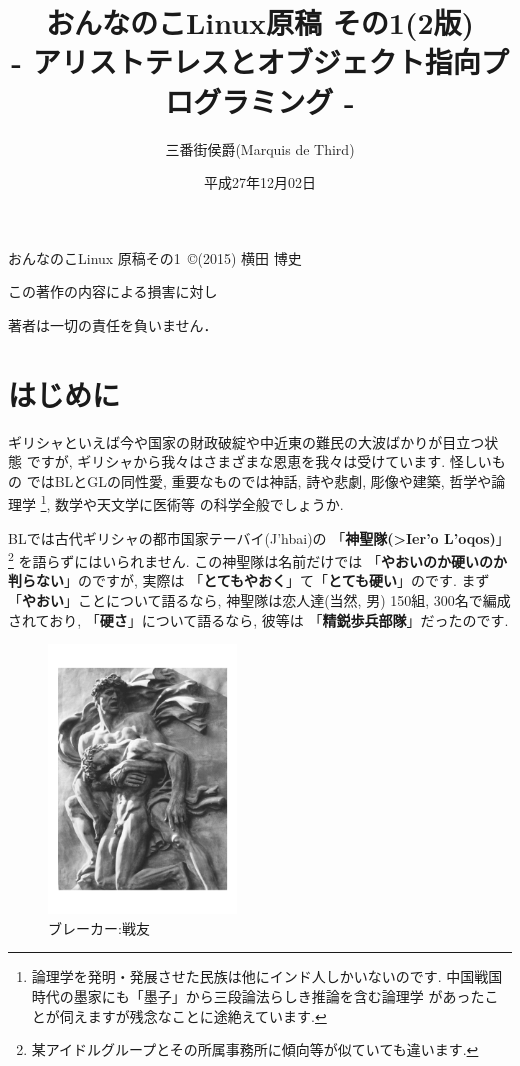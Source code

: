 \documentclass[b5j,8pt,twocolumn]{ltjsarticle}
\title{おんなのこLinux原稿 その1(2版)\\
- アリストテレスとオブジェクト指向プログラミング -}
\author{三番街侯爵(Marquis de Third)}
\date{
平成27年12月02日
 }
\newcommand{\textgreek}[1]{\begingroup\fontencoding{LGR}\selectfont#1\endgroup}
\begin{document}
\maketitle



おんなのこLinux 原稿その1~\copyright (2015) 横田 博史\par

この著作の内容による損害に対し

著者は一切の責任を負いません．
\clearpage
\newpage
\setcounter{page}{1}

\section{はじめに}

ギリシャといえば今や国家の財政破綻や中近東の難民の大波ばかりが目立つ状態
ですが, ギリシャから我々はさまざまな恩恵を我々は受けています. 怪しいもの
ではBLとGLの同性愛, 重要なものでは神話, 詩や悲劇, 彫像や建築, 哲学や論理学
\footnote{論理学を発明・発展させた民族は他にインド人しかいないのです.
 中国戦国時代の墨家にも「墨子」\cite{墨子}から三段論法らしき推論を含む論理学
があったことが伺えますが残念なことに途絶えています.}, 数学や天文学に医術等
の科学全般でしょうか.
\newline

BLでは古代ギリシャの都市国家テーバイ(\textgreek{J'hbai})の
「\textbf{神聖隊(\textgreek{>Ier'o L'oqos})}」
\footnote{某アイドルグループとその所属事務所に傾向等が似ていても違います.}
を語らずにはいられません. この神聖隊は名前だけでは
「\textbf{やおいのか硬いのか判らない}」のですが, 実際は
「\textbf{とてもやおく}」て「\textbf{とても硬い}」のです. まず
「\textbf{やおい}」ことについて語るなら, 神聖隊は恋人達(当然, 男)
150組, 300名で編成されており, 「\textbf{硬さ}」について語るなら, 彼等は
「\textbf{精鋭歩兵部隊}」だったのです.
\newline
 
 
\begin{figure}
\includegraphics[width=5cm]{arno_breker_kameradschaft.pdf}
\caption{ブレーカー:戦友}
\label{fig:breker2}
\end{figure}
\end{document}
